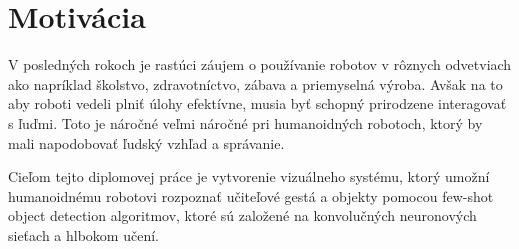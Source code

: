 \chapter{Motivácia}\label{chap:motivation}
V posledných rokoch je rastúci záujem o používanie robotov v rôznych odvetviach ako napríklad školstvo, zdravotníctvo, zábava a priemyselná výroba. Avšak na to aby roboti vedeli plniť úlohy efektívne, musia byť schopný prirodzene interagovať s ľuďmi. Toto je náročné veľmi náročné pri humanoidných robotoch, ktorý by mali napodobovať ľudský vzhľad a správanie. 

Cieľom tejto diplomovej práce je vytvorenie vizuálneho systému, ktorý umožní humanoidnému robotovi rozpoznať učiteľové gestá a objekty pomocou few-shot object detection algoritmov, ktoré sú založené na konvolučných neuronových sieťach a hlbokom učení. 
